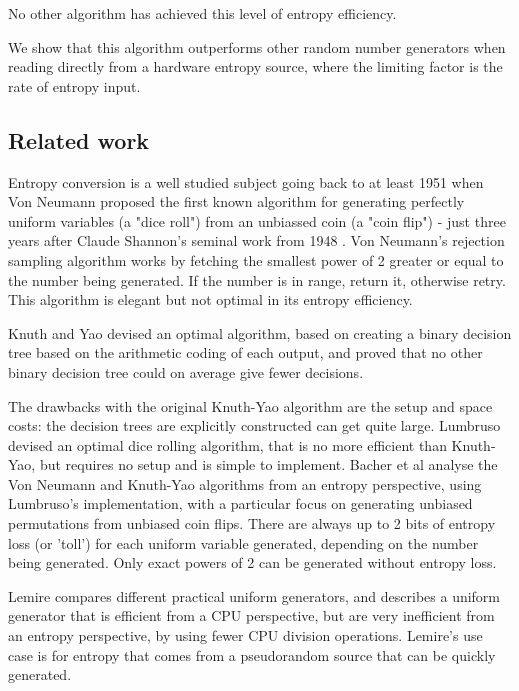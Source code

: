 \documentclass[12pt]{article}
\begin{document}
No other algorithm has achieved this level of entropy efficiency.

We show that this algorithm outperforms other random number generators when reading directly from a hardware entropy source, where the limiting factor is the rate of entropy input.

\subsection{Related work}

Entropy conversion is a well studied subject going back to at least 1951 when Von Neumann \cite{neumann51} proposed the first known algorithm for generating perfectly uniform variables (a "dice roll") from an unbiassed coin (a "coin flip") - just three years after Claude Shannon's seminal work from 1948 \cite{shannon1948mathematical}. Von Neumann's rejection sampling algorithm works by fetching the smallest power of 2 greater or equal to the number being generated. If the number is in range, return it, otherwise retry. This algorithm is elegant but not optimal in its entropy efficiency.

Knuth and Yao \cite{Knuth1976TheCO} devised an optimal algorithm, based on creating a binary decision tree based on the arithmetic coding of each output, and proved that no other binary decision tree could on average give fewer decisions.

The drawbacks with the original Knuth-Yao algorithm are the setup and space costs: the decision trees are explicitly constructed can get quite large. Lumbruso \cite{lumbroso2013optimal} devised an optimal dice rolling algorithm, that is no more efficient than Knuth-Yao, but requires no setup and is simple to implement. Bacher et al \cite{bacher2017} analyse the Von Neumann and Knuth-Yao algorithms from an entropy perspective, using Lumbruso's implementation, with a particular focus on generating unbiased permutations from unbiased coin flips. There are always up to 2 bits of entropy loss (or 'toll') for each uniform variable generated, depending on the number being generated. Only exact powers of 2 can be generated without entropy loss.

Lemire \cite{lemire2019fast} compares different practical uniform generators, and describes a uniform generator that is efficient from a CPU perspective, but are very inefficient from an entropy perspective, by using fewer CPU division operations. Lemire's use case is for entropy that comes from a pseudorandom source that can be quickly generated.
\end{document}
